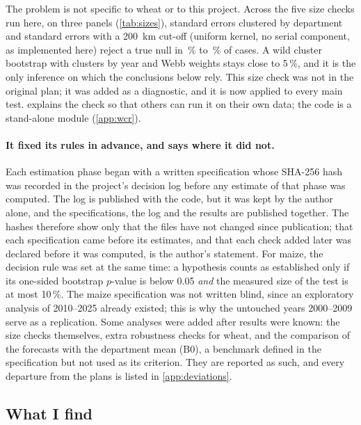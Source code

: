 The problem is not specific to wheat or to this project. Across the five size checks run here, on three panels (\cref{tab:sizes}), standard errors clustered by department and \textcite{conley1999} standard errors with a 200~km cut-off (uniform kernel, no serial component, as implemented here) reject a true null in \UsualSizeMin\,\% to \UsualSizeMax\,\% of cases. A wild cluster bootstrap with clusters by year and Webb weights \parencite{cameron2008,webb2023} stays close to 5\,\%, and it is the only inference on which the conclusions below rely. This size check was not in the original plan; it was added as a diagnostic, and it is now applied to every main test.  explains the check so that others can run it on their own data; the code is a stand-alone module (\cref{app:wcr}).

\paragraph{It fixed its rules in advance, and says where it did not.} Each estimation phase began with a written specification whose SHA-256 hash was recorded in the project's decision log before any estimate of that phase was computed. The log is published with the code, but it was kept by the author alone, and the specifications, the log and the results are published together. The hashes therefore show only that the files have not changed since publication; that each specification came before its estimates, and that each check added later was declared before it was computed, is the author's statement. For maize, the decision rule was set at the same time: a hypothesis counts as established only if its one-sided bootstrap $p$-value is below 0.05 \emph{and} the measured size of the test is at most 10\,\%. The maize specification was not written blind, since an exploratory analysis of 2010--2025 already existed; this is why the untouched years 2000--2009 serve as a replication. Some analyses were added after results were known: the size checks themselves, extra robustness checks for wheat, and the comparison of the forecasts with the department mean (B0), a benchmark defined in the specification but not used as its criterion. They are reported as such, and every departure from the plans is listed in \cref{app:deviations}.

\subsection*{What I find}

